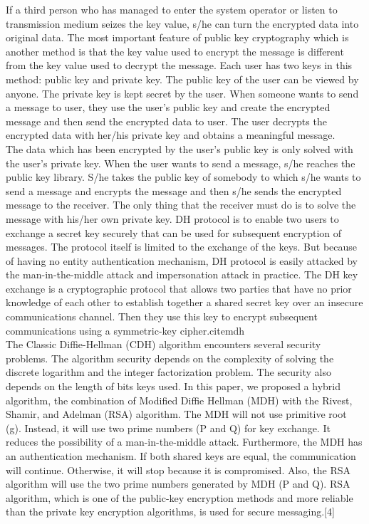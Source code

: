 If a third person who has managed to enter the system operator or listen to transmission medium
seizes the  key value,  s/he can turn  the  encrypted data into  original data.  The most  important feature of public key cryptography which is another method is that the key value used to encrypt the message is different from the key value used to decrypt the message. Each user has two keys
in this method: public key and private key. The public key of the user can be viewed by anyone.
The private key is kept secret by the user. When someone wants to send a message to user, they
use the user's public key and create the encrypted message and then send the encrypted data to
user. The user  decrypts the  encrypted data with  her/his private  key  and obtains  a meaningful
message.\\
The data which has been encrypted by the user’s public key is only solved with the user’s private key. When the user wants to send a message, s/he reaches the public key library. S/he takes the public key of somebody to which s/he wants to send a message and encrypts the message and then s/he sends the encrypted message to the receiver. The only thing that the receiver must do is to solve the message with his/her own private key. DH protocol is to enable two users to exchange a secret key securely that can be used for subsequent encryption of messages. The protocol itself is limited to the exchange of the keys. But because of having no entity authentication mechanism, DH protocol is easily attacked by the man-in-the-middle attack and impersonation attack in practice. The DH key exchange is a cryptographic protocol that allows two parties that have no prior knowledge of each other to establish together a shared secret key over an insecure communications channel. Then they use this key to encrypt subsequent communications using a symmetric-key cipher.cite{mdh}\\
The Classic Diffie-Hellman (CDH) algorithm encounters several security problems. The algorithm security depends on the complexity of solving the discrete logarithm and the integer factorization problem. The security also depends on the length of bits keys used. In this paper, we proposed a hybrid algorithm, the combination of Modified Diffie Hellman (MDH) with the Rivest, Shamir, and Adelman (RSA) algorithm. The MDH will not use primitive root (g). Instead, it will use two prime numbers (P and Q) for key exchange. It reduces the possibility of a man-in-the-middle attack. Furthermore, the MDH has an authentication mechanism. If both shared keys are equal, the communication will continue. Otherwise, it will stop because it is compromised. Also, the RSA algorithm will use the two prime numbers generated by MDH (P and Q). RSA algorithm, which is one of the public-key encryption methods and more reliable than the private key encryption algorithms, is used for secure messaging.[4]\\
